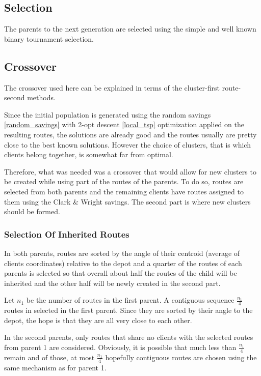 \documentclass{article} %
\begin{document}
\subsection{Selection}

The parents to the next generation are selected using the simple and well known binary tournament selection.


\subsection{Crossover}

The crossover used here can be explained in terms of the cluster-first route-second methods.\newline

Since the initial population is generated using the random savings \ref{random_savings} with 2-opt descent \ref{local_tsp} optimization applied on the resulting routes, the solutions are already good and the routes usually are pretty close to the best known solutions. However the choice of clusters, that is which clients belong together, is somewhat far from optimal.\newline

Therefore, what was needed was a crossover that would allow for new clusters to be created while using part of the routes of the parents. To do so, routes are selected from both parents and the remaining clients have routes assigned to them using the Clark \& Wright savings. The second part is where new clusters should be formed.


\subsubsection{Selection Of Inherited Routes}

In both parents, routes are sorted by the angle of their centroid (average of clients coordinates) relative to the depot and a quarter of the routes of each parents is selected so that overall about half the routes of the child will be inherited and the other half will be newly created in the second part.\newline

Let $n_1$ be the number of routes in the first parent. A contiguous sequence $\frac{n_1}{4}$ routes in selected in the first parent. Since they are sorted by their angle to the depot, the hope is that they are all very close to each other.\newline

In the second parents, only routes that share no clients with the selected routes from parent 1 are considered.  Obviously, it is possible that much less than $\frac{n_1}{4}$ remain and of those, at most $\frac{n_1}{4}$ hopefully contiguous routes are chosen using the same mechanism as for parent 1.\newline
\end{document}
